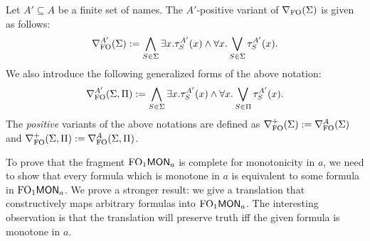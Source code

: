 \begin{definition}\label{def:monbasicformofoe}
Let $A'\subseteq A$ be a finite set of names. The $A'$-positive variant of $\nabla_{\mathrm{FO}}(\Sigma)$ is given as follows:
\[
	\nabla^{A'}_\mathrm{FO}(\Sigma) := \bigwedge_{S\in\Sigma} \exists x. \tau^{A'}_S(x) \land \forall x. \bigvee_{S\in\Sigma} \tau^{A'}_S(x).
\]
We also introduce the following generalized forms of the above notation:
\[
	\nabla^{A'}_\mathrm{FO}(\Sigma,\Pi) := \bigwedge_{S\in\Sigma} \exists x. \tau^{A'}_S(x) \land \forall x. \bigvee_{S\in\Pi} \tau^{A'}_S(x) .
\]
The \emph{positive} variants of the above notations are defined as $\nabla^+_{\mathrm{FO}}(\Sigma) := \nabla^{A}_\mathrm{FO}(\Sigma)$ and $\nabla^+_{\mathrm{FO}}(\Sigma,\Pi) := \nabla^{A}_\mathrm{FO}(\Sigma,\Pi)$.
\end{definition}

To prove that the fragment $\mathrm{FO}_1\mathsf{MON}_{a}$ is complete for monotonicity in $a$, we need to show that every formula which is monotone in $a$ is equivalent to some formula in $\mathrm{FO}_1\mathsf{MON}_{a}$. We prove a stronger result: we give a translation that constructively maps arbitrary formulas into $\mathrm{FO}_1\mathsf{MON}_{a}$. The interesting observation is that the translation will preserve truth iff the given formula is monotone in $a$.

